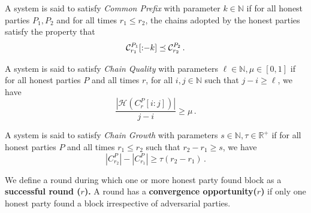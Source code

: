 \begin{definition}
  A system is said to satisfy \emph{Common Prefix} with parameter $k \in \mathbb{N}$ if
  for all honest parties $P_1, P_2$ and for all times $r_1 \leq r_2$, the chains adopted
  by the honest parties satisfy the property that
  \[
    \mathcal{C}^{P_1}_{r_1}[{:}{-k}] \preceq \mathcal{C}^{P_2}_{r_2}\,.
  \]
\end{definition}

\begin{definition}
  A system is said to satisfy \emph{Chain Quality} with parameters $\ell \in \mathbb{N}, \mu \in [0, 1]$ if for all honest parties $P$ and all times $r$, for all $i, j \in \mathbb{N}$ such that $j - i \geq \ell$, we have
  \[\frac{|\mathcal{H}(C^P_r[{i}{:}{j}])|}{j - i} \geq \mu\,.\]
\end{definition}

\begin{definition}
  A system is said to satisfy \emph{Chain Growth} with parameters $s \in \mathbb{N}, \tau \in \mathbb{R}^+$ if for all honest parties $P$ and all times $r_1 \leq r_2$ such that $r_2 - r_1 \geq s$, we have
  \[|C^P_{r_2}| - |C^P_{r_1}| \geq \tau (r_2 - r_1)\,.\]
\end{definition}


We define a round during which one or more honest party found block as a \textbf{successful round (\texorpdfstring{$r$}{Lg}).} A round has a \textbf{convergence opportunity(\texorpdfstring{$r$}{Lg})} if only one honest party found a block irrespective of adversarial parties.


